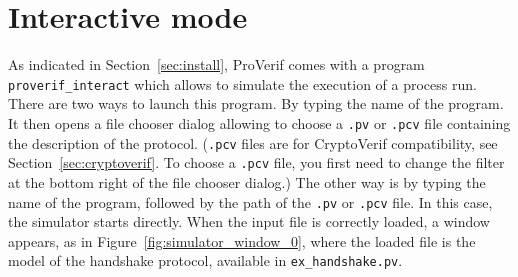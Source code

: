 \documentclass{book}
\begin{document}
%

%
%





\section{Interactive mode}\label{secroverif_interact}
As indicated in Section~\ref{sec:install}, ProVerif comes with a program \texttt{proverif\_interact} which allows to simulate the execution of a process run. There are two ways to launch this program. By typing the name of the program. It then opens a file chooser dialog allowing to choose a \texttt{.pv} or \texttt{.pcv} file containing the description of the protocol. (\texttt{.pcv} files are for CryptoVerif compatibility, see Section~\ref{sec:cryptoverif}. To choose a \texttt{.pcv} file, you first need to change the filter at the bottom right of the file chooser dialog.) The other way is by typing the name of the program, followed by the path of the \texttt{.pv} or \texttt{.pcv} file. In this case, the simulator starts directly.
When the input file is correctly loaded, a window appears, as in Figure~\ref{fig:simulator_window_0}, where the loaded file is the model of the handshake protocol, available in \texttt{{\docexdir}ex\_handshake.pv}.
\end{document}
